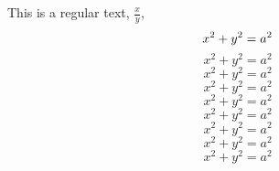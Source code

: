 \documentclass[preview]{standalone}
\begin{document}
This is a regular text,
            $\displaystyle\frac{x}{y}$,
            $$\small x^2+y^2=a^2$$
            $$x^2+y^2=a^2$$
            $$x^2+y^2=a^2$$
            $$x^2+y^2=a^2$$
            {\small $$x^2+y^2=a^2$$}
            $$x^2+y^2=a^2$$
            $$x^2+y^2=a^2$$
            $$x^2+y^2=a^2$$
            $$x^2+y^2=a^2$$
\end{document}
